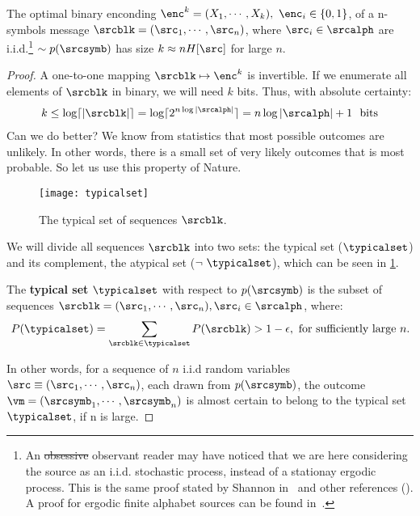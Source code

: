 \begin{theorem}\label{th:source_encoding}
	The optimal binary enconding \(\enc^{k}=(X_1, \cdots, X_k),~ \enc_i \in \{0,1\}\),  of a n-symbols message \(\srcblk=(\src_1, \cdots, \src_n)\), where \(\src_i \in \srcalph\) are i.i.d.\footnote{An \st{obsessive} observant reader may have noticed that we are here considering the source as an i.i.d. stochastic process, instead of a stationay ergodic process.  This is the same proof stated by Shannon in~ and other references (). A proof for ergodic finite alphabet sources can be found in~.}
	\(\sim p(\srcsymb)\) has size \(k \approx n H[\src]\) for large \(n\).
\end{theorem}
\begin{proof}
	A one-to-one mapping \(\srcblk \mapsto \enc^{k}\) is invertible. If we enumerate all elements of \(\srcblk\) in binary, we will need \(k\) bits. Thus, with absolute certainty:
	\begin{align}
		k\leq \log \lceil|\srcblk |\rceil = \log \lceil 2^{n \log |\srcalph|}\rceil = n \log |\srcalph|+1~\text{ bits}\label{eq:k_upperbound}
	\end{align}
	Can we do better? We know from statistics that most possible outcomes are unlikely. In other words, there is a small set of very likely outcomes that is most probable. So let us use this property of Nature.
	\begin{figure}
		[ht!] \centering
		\texttt{[image: typicalset]}
		\caption{The typical set of  sequences \(\srcblk\).}\label{fig:typical_atypical} \end{figure}

	We will divide all sequences \(\srcblk\) into two sets: the typical set (\(\typicalset\)) and its complement, the atypical set (\(\neg~ \typicalset\)), which can be seen in \cref{fig:typical_atypical}.

	\begin{definition}
		The \textbf{typical set} \(\typicalset\) with respect to \(p(\srcsymb)\) is the subset of sequences \(\srcblk=(\src_1,\cdots,\src_n ), \src_i \in \srcalph\), where:
		\begin{align}
			P(\typicalset)=\sum_{\srcblk \in \typicalset} P(\srcblk)> 1-\epsilon, \text{ for sufficiently large }n.\label{typical_set_definition}
		\end{align}
	\end{definition}
	In other words, for a sequence of \(n\) i.i.d random variables \(\src \equiv(\src_1,\cdots,\src_n )\), each drawn from \(p(\srcsymb)\), the outcome \(\vm=(\srcsymb_1, \cdots, \srcsymb_n)\) is almost certain to belong to the typical set \(\typicalset\), if n is large.


\end{proof}
